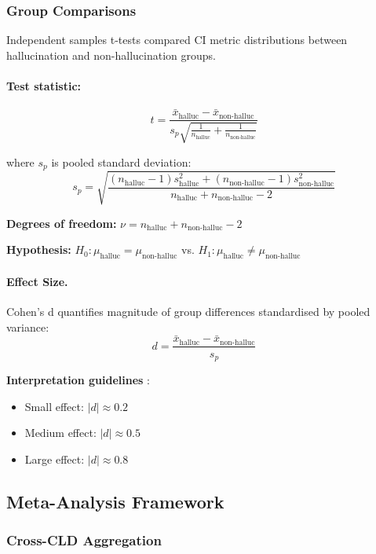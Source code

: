 \subsubsection{Group Comparisons}

Independent samples t-tests compared CI metric distributions between hallucination and non-hallucination groups.

\paragraph{Test statistic:}
\[
t = \frac{\bar{x}_{\text{halluc}} - \bar{x}_{\text{non-halluc}}}{s_p \sqrt{\frac{1}{n_{\text{halluc}}} + \frac{1}{n_{\text{non-halluc}}}}}
\]

where \(s_p\) is pooled standard deviation:
\[
s_p = \sqrt{\frac{(n_{\text{halluc}}-1)s_{\text{halluc}}^2 + (n_{\text{non-halluc}}-1)s_{\text{non-halluc}}^2}{n_{\text{halluc}}+n_{\text{non-halluc}}-2}}
\]

\textbf{Degrees of freedom:} \(\nu = n_{\text{halluc}} + n_{\text{non-halluc}} - 2\)

\textbf{Hypothesis:} \(H_0: \mu_{\text{halluc}} = \mu_{\text{non-halluc}}\) vs. \(H_1: \mu_{\text{halluc}} \neq \mu_{\text{non-halluc}}\)

\paragraph{Effect Size.} Cohen's d quantifies magnitude of group differences standardised by pooled variance:
\[
d = \frac{\bar{x}_{\text{halluc}} - \bar{x}_{\text{non-halluc}}}{s_p}
\]

\textbf{Interpretation guidelines} \cite{cohen1988statistical}:
\begin{itemize}
    \item Small effect: \(|d| \approx 0.2\)
    \item Medium effect: \(|d| \approx 0.5\)
    \item Large effect: \(|d| \approx 0.8\)
\end{itemize}

\subsection{Meta-Analysis Framework}

\subsubsection{Cross-CLD Aggregation}

